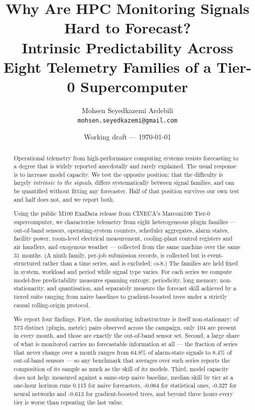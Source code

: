 \documentclass[11pt,a4paper]{article}
\title{Why Are HPC Monitoring Signals Hard to Forecast?\\
       \large Intrinsic Predictability Across Eight Telemetry Families
       of a Tier-0 Supercomputer}
\author{Mohsen Seyedkazemi Ardebili\\
        \small \texttt{mohsen.seyedkazemi@gmail.com}}
\date{Working draft --- \today}
\newcommand{\num}[1]{#1}
\newcommand{\oi}[1]{\textsc{oi-#1}}
\begin{document}
\maketitle

\begin{abstract}
Operational telemetry from high-performance computing systems resists
forecasting to a degree that is widely reported anecdotally and rarely
explained. The usual response is to increase model capacity. We test the
opposite position: that the difficulty is largely \emph{intrinsic to the
signals}, differs systematically between signal families, and can be quantified
without fitting any forecaster. Half of that position survives our own test and
half does not, and we report both.

Using the public M100 ExaData release from CINECA's Marconi100 Tier-0
supercomputer, we characterise telemetry from eight heterogeneous plugin
families --- out-of-band sensors, operating-system counters, scheduler
aggregates, alarm states, facility power, room-level electrical measurement,
cooling-plant control registers and air handlers, and exogenous weather ---
collected from the same machine over the same 31 months. (A ninth family,
per-job submission records, is collected but is event-structured rather than a
time series, and is excluded; \oi{8}.) The families are held
fixed in system, workload and period while signal type varies.
For each series we compute model-free predictability measures spanning entropy,
periodicity, long memory, non-stationarity, and quantisation, and separately
measure the forecast skill achieved by a tiered suite ranging from naive
baselines to gradient-boosted trees under a strictly causal rolling-origin
protocol.

We report four findings. First, the monitoring infrastructure is itself
non-stationary: of \num{573} distinct (plugin, metric) pairs observed across the
campaign, only \num{104} are present in every month, and those are exactly the
out-of-band sensor set. Second, a large share of what is monitored carries no
forecastable information at all --- the fraction of series that never change
over a month ranges from \num{64.8}\% of alarm-state signals to \num{8.4}\% of
out-of-band sensors --- so any benchmark that averages over such series reports
the composition of its sample as much as the skill of its models. Third, model
capacity does not help: measured against a same-step naive baseline, median
skill by tier at a one-hour horizon runs \num{0.115} for naive forecasters,
\num{-0.064} for statistical ones, \num{-0.327} for neural networks and
\num{-0.613} for gradient-boosted trees, and beyond three hours every tier is
worse than repeating the last value.


\end{abstract}
\end{document}
